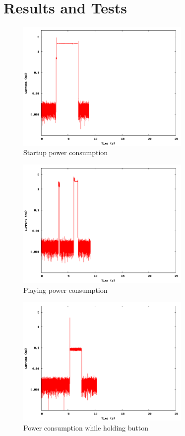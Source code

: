 \section{Results and Tests}

\begin{figure}[h]
\centering
\includegraphics[width=0.75\textwidth]{data/startup.png}
\caption{Startup power consumption}
\label{fig:startuppower}
\end{figure}

\begin{figure}[h]
\centering
\includegraphics[width=0.75\textwidth]{data/play.png}
\caption{Playing power consumption}
\label{fig:playpower}
\end{figure}


\begin{figure}[h]
\centering
\includegraphics[width=0.75\textwidth]{data/hold.png}
\caption{Power consumption while holding button}
\label{fig:holdingpower}
\end{figure}
